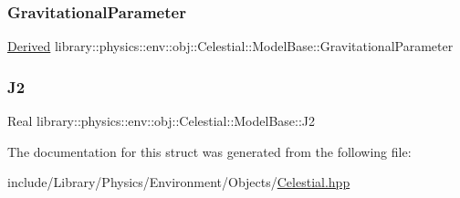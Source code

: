 \subsubsection{\texorpdfstring{Gravitational\+Parameter}{GravitationalParameter}}
{\footnotesize\ttfamily \hyperlink{classlibrary_1_1physics_1_1units_1_1_derived}{Derived} library\+::physics\+::env\+::obj\+::\+Celestial\+::\+Model\+Base\+::\+Gravitational\+Parameter\hspace{0.3cm}{\ttfamily [static]}}

\mbox{\label{structlibrary_1_1physics_1_1env_1_1obj_1_1_celestial_1_1_model_base_a9016f0c506cfd899a9854c052419c653}} 
\subsubsection{\texorpdfstring{J2}{J2}}
{\footnotesize\ttfamily Real library\+::physics\+::env\+::obj\+::\+Celestial\+::\+Model\+Base\+::\+J2\hspace{0.3cm}{\ttfamily [static]}}



The documentation for this struct was generated from the following file\+:\begin{DoxyCompactItemize}
\item 
include/\+Library/\+Physics/\+Environment/\+Objects/\hyperlink{_celestial_8hpp}{Celestial.\+hpp}\end{DoxyCompactItemize}
